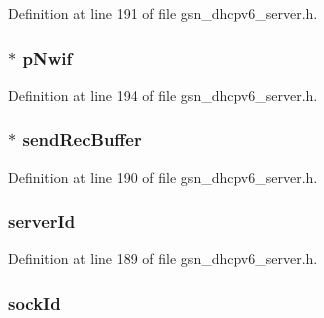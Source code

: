 Definition at line 191 of file gsn\_\-dhcpv6\_\-server.h.

\hypertarget{a00047_a98d510676ecd134a5e9ac61bf222cded}{
\subsubsection[{pNwif}]{$\ast$ {\bf pNwif}}}
\label{a00047_a98d510676ecd134a5e9ac61bf222cded}


Definition at line 194 of file gsn\_\-dhcpv6\_\-server.h.

\hypertarget{a00047_a2c58739c6106df2d2968e4abd908650f}{
\subsubsection[{sendRecBuffer}]{$\ast$ {\bf sendRecBuffer}}}
\label{a00047_a2c58739c6106df2d2968e4abd908650f}


Definition at line 190 of file gsn\_\-dhcpv6\_\-server.h.

\hypertarget{a00047_a21dfcbd048f42b506500600ce9be2897}{
\subsubsection[{serverId}]{ {\bf serverId}}}
\label{a00047_a21dfcbd048f42b506500600ce9be2897}


Definition at line 189 of file gsn\_\-dhcpv6\_\-server.h.

\hypertarget{a00047_ab14e42f085ec55398e27c831f8f031d2}{
\subsubsection[{sockId}]{ {\bf sockId}}}
\label{a00047_ab14e42f085ec55398e27c831f8f031d2}


